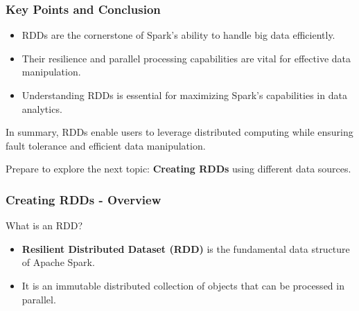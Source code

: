\documentclass[aspectratio=169]{beamer}
\begin{document}
\begin{frame}[fragile]
    \frametitle{Key Points and Conclusion}
    \begin{itemize}
        \item RDDs are the cornerstone of Spark's ability to handle big data efficiently.
        \item Their resilience and parallel processing capabilities are vital for effective data manipulation.
        \item Understanding RDDs is essential for maximizing Spark's capabilities in data analytics.
    \end{itemize}
    
    In summary, RDDs enable users to leverage distributed computing while ensuring fault tolerance and efficient data manipulation.
    
    Prepare to explore the next topic: \textbf{Creating RDDs} using different data sources.
\end{frame}

\begin{frame}[fragile]
    \frametitle{Creating RDDs - Overview}
    \begin{block}{What is an RDD?}
        \begin{itemize}
            \item \textbf{Resilient Distributed Dataset (RDD)} is the fundamental data structure of Apache Spark.
            \item It is an immutable distributed collection of objects that can be processed in parallel.
        \end{itemize}
    \end{block}
\end{frame}
\end{document}
